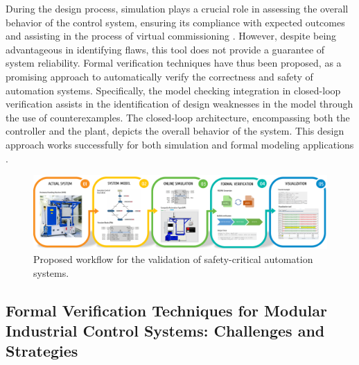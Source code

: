 \begin{bibunit}
During the design process, simulation plays a crucial role in assessing the overall behavior of the control system, ensuring its compliance with expected outcomes and assisting in the process of virtual commissioning \cite{galkin2023automatic}. However, despite being advantageous in identifying flaws, this tool does not provide a guarantee of system reliability. 
Formal verification techniques have thus been proposed, as a promising approach to automatically verify the correctness and safety of automation systems.
Specifically, the model checking integration in closed-loop verification \cite{xavier2023formal} assists in the identification of design weaknesses in the model through the use of counterexamples. The closed-loop architecture, encompassing both the controller and the plant, depicts the overall behavior of the system. This design approach works successfully for both simulation and formal modeling applications \cite{sinha2019survey}. 

\begin{figure}
    \centering
    \includegraphics[width=\textwidth]{MX_Papers/Paper4/pictures/lilli02.pdf}
    \caption{Proposed workflow for the validation of safety-critical automation systems.} 
    \label{fig:workflow}
\end{figure}

\subsection{Formal Verification Techniques for  Modular Industrial Control Systems: Challenges and Strategies}


\end{bibunit}
